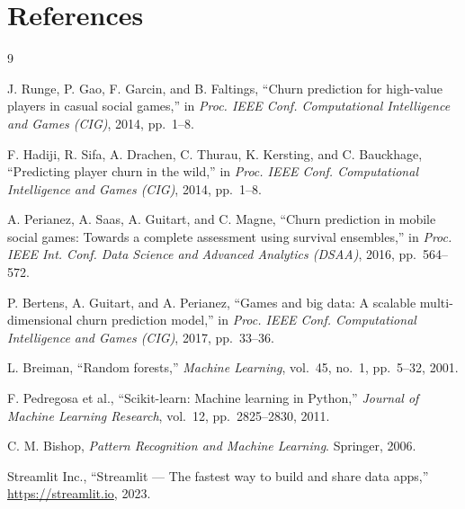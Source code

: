 \documentclass[12pt, a4paper]{article}
\begin{document}
\newpage
\section*{References}

\begin{thebibliography}{9}

J. Runge, P. Gao, F. Garcin, and B. Faltings,
``Churn prediction for high-value players in casual social games,''
in \textit{Proc. IEEE Conf. Computational Intelligence and Games (CIG)},
2014, pp.~1--8.

F. Hadiji, R. Sifa, A. Drachen, C. Thurau, K. Kersting, and C. Bauckhage,
``Predicting player churn in the wild,''
in \textit{Proc. IEEE Conf. Computational Intelligence and Games (CIG)},
2014, pp.~1--8.

A. Perianez, A. Saas, A. Guitart, and C. Magne,
``Churn prediction in mobile social games: Towards a complete assessment
using survival ensembles,''
in \textit{Proc. IEEE Int. Conf. Data Science and Advanced Analytics (DSAA)},
2016, pp.~564--572.

P. Bertens, A. Guitart, and A. Perianez,
``Games and big data: A scalable multi-dimensional churn prediction model,''
in \textit{Proc. IEEE Conf. Computational Intelligence and Games (CIG)},
2017, pp.~33--36.

L. Breiman,
``Random forests,''
\textit{Machine Learning}, vol.~45, no.~1, pp.~5--32, 2001.

F. Pedregosa et al.,
``Scikit-learn: Machine learning in Python,''
\textit{Journal of Machine Learning Research}, vol.~12, pp.~2825--2830, 2011.

C. M. Bishop,
\textit{Pattern Recognition and Machine Learning}.
Springer, 2006.

Streamlit Inc.,
``Streamlit — The fastest way to build and share data apps,''
\url{https://streamlit.io}, 2023.

\end{thebibliography}
\end{document}

